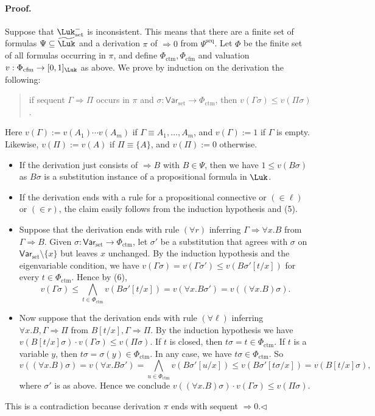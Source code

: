 \paragraph{Proof.} Suppose that $\Luk_{\mathrm{set}}^{-}$ is inconsistent. This means that there are a finite set of formulas $\Psi\subseteq\widetilde{\Luk}$ and a derivation $\pi$ of $\Rightarrow0$ from $\Psi^{\mathrm{seq}}$. Let $\Phi$ be the finite set of all formulas occurring in $\pi$, and define $\Phi_{\mathrm{ctm}},\Phi_{\mathrm{cfm}}$ and valuation $v:\Phi_{\mathrm{cfm}}\to[0,1]_{\Luk}$ as above.
We prove by induction on the derivation the following:
\begin{quote}
if sequent $\Gamma\Rightarrow\Pi$ occurs in $\pi$ and $\sigma:\mathsf{Var}_{\mathrm{set}}\to\Phi_{\mathrm{ctm}}$, then $v(\Gamma\sigma)\le v(\Pi\sigma)$.
\end{quote}
Here $v(\Gamma):=v(A_1)\cdots v(A_m)$ if $\Gamma\equiv A_1,\ldots,A_m$, and $v(\Gamma):=1$ if $\Gamma$ is empty. Likewise, $v(\Pi):=v(A)$ if $\Pi\equiv\{A\}$, and $v(\Pi):=0$ otherwise.
\begin{itemize}
\item If the derivation just consists of $\Rightarrow B$ with $B\in\Psi$, then we have $1\le v(B\sigma)$ as $B\sigma$ is a substitution instance of a propositional formula in $\Luk$.
\item If the derivation ends with a rule for a propositional connective or $(\in\ell)$ or $(\in r)$, the claim easily follows from the induction hypothesis and (5).
\item Suppose that the derivation ends with rule $(\forall r)$ inferring $\Gamma\Rightarrow\forall x.B$ from $\Gamma\Rightarrow B$. Given $\sigma:\mathsf{Var}_{\mathrm{set}}\to\Phi_{\mathrm{ctm}}$, let $\sigma'$ be a substitution that agrees with $\sigma$ on $\mathsf{Var}_{\mathrm{set}}\setminus\{x\}$ but leaves $x$ unchanged. By the induction hypothesis and the eigenvariable condition, we have $v(\Gamma\sigma)=v(\Gamma\sigma')\le v(B\sigma'[t/x])$ for every $t\in\Phi_{\mathrm{ctm}}$. Hence by (6),
\[
 v(\Gamma\sigma)\le\bigwedge_{t\in\Phi_{\mathrm{ctm}}}v(B\sigma'[t/x])
 =v(\forall x.B\sigma')=v((\forall x.B)\sigma).
\]
\item Now suppose that the derivation ends with rule $(\forall\ell)$ inferring $\forall x.B,\Gamma\Rightarrow\Pi$ from $B[t/x],\Gamma\Rightarrow\Pi$. By the induction hypothesis we have $v(B[t/x]\sigma)\cdot v(\Gamma\sigma)\le v(\Pi\sigma)$.
If $t$ is closed, then $t\sigma=t\in\Phi_{\mathrm{ctm}}$. If $t$ is a variable $y$, then $t\sigma=\sigma(y)\in\Phi_{\mathrm{ctm}}$. In any case, we have $t\sigma\in\Phi_{\mathrm{ctm}}$. So
\[
 v((\forall x.B)\sigma)=v(\forall x.B\sigma')=\bigwedge_{u\in\Phi_{\mathrm{ctm}}}v(B\sigma'[u/x])
 \le v(B\sigma'[t\sigma/x])=v(B[t/x]\sigma),
\]
where $\sigma'$ is as above. Hence we conclude $v((\forall x.B)\sigma)\cdot v(\Gamma\sigma)\le v(\Pi\sigma)$.
\end{itemize}
This is a contradiction because derivation $\pi$ ends with sequent $\Rightarrow0$.\hfill$\triangleleft$
